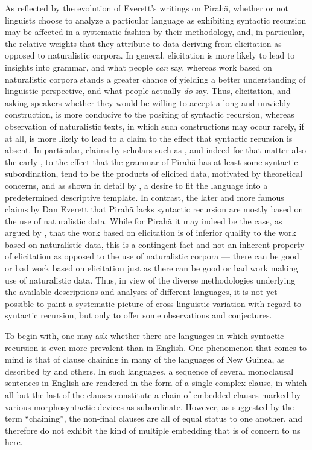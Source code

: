 \documentclass[output=paper,colorlinks,citecolor=brown
]{langscibook}
\begin{document}
As reflected by the evolution of Everett's writings on Pirahã, whether or not linguists choose to analyze a particular language as exhibiting syntactic recursion may be affected in a systematic fashion by their methodology, and, in particular, the relative weights that they attribute to data deriving from elicitation as opposed to naturalistic corpora.  In general, elicitation is more likely to lead to insights into grammar, and what people \emph{can} say, whereas work based on naturalistic corpora stands a greater chance of yielding a better understanding of linguistic perspective, and what people actually \emph{do} say.  Thus, elicitation, and asking speakers whether they would be willing to accept a long and unwieldy construction, is more conducive to the positing of syntactic recursion, whereas observation of naturalistic texts, in which such constructions may occur rarely, if at all, is more likely to lead to a claim to the effect that syntactic recursion is absent.  In particular, claims by scholars such as \citet{sandalo2018selfembedded}, and indeed for that matter also the early \citet{everett1986piraha}, to the effect that the grammar of Pirahã has at least some syntactic subordination, tend to be the products of elicited data, motivated by theoretical concerns, and as shown in detail by , a desire to fit the language into a predetermined descriptive template.  In contrast, the later and more famous claims by Dan Everett that Pirahã lacks syntactic recursion are mostly based on the use of naturalistic data.  While for Pirahã it may indeed be the case, as argued by , that the work based on elicitation is of inferior quality to the work based on naturalistic data, this is a contingent fact and not an inherent property of elicitation as opposed to the use of naturalistic corpora — there can be good or bad work based on elicitation just as there can be good or bad work making use of naturalistic data.  Thus, in view of the diverse methodologies underlying the available descriptions and analyses of different languages, it is not yet possible to paint a systematic picture of cross-linguistic variation with regard to syntactic recursion, but only to offer some observations and conjectures.

To begin with, one may ask whether there are languages in which syntactic recursion is even more prevalent than in English.  One phenomenon that comes to mind is that of clause chaining in many of the languages of New Guinea, as described by \citet{foley2010clause} and others.  In such languages, a sequence of several monoclausal sentences in English are rendered in the form of a single complex clause, in which all but the last of the clauses constitute a chain of embedded clauses marked by various morphosyntactic devices as subordinate.  However, as suggested by the term ``chaining'', the non-final clauses are all of equal status to one another, and therefore do not exhibit the kind of multiple embedding that is of concern to us here.
\end{document}
